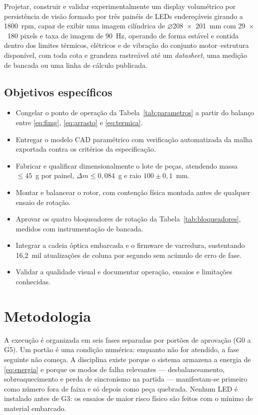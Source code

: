 \documentclass[10pt,a4paper,twocolumn]{article}
\begin{document}
Projetar, construir e validar experimentalmente um display volumétrico por
persistência de visão formado por três painéis de LEDs endereçáveis girando a
1800~rpm, capaz de exibir uma imagem cilíndrica de
$\varnothing$208~$\times$~201~mm com 29~$\times$~180 pixels e taxa de imagem de
90~Hz, operando de forma estável e contida dentro dos limites térmicos,
elétricos e de vibração do conjunto motor--estrutura disponível, com toda cota
e grandeza rastreável até um \emph{datasheet}, uma medição de bancada ou uma
linha de cálculo publicada.

\subsection{Objetivos específicos}

\begin{itemize}
  \item Congelar o ponto de operação da Tabela~\ref{tab:parametros} a partir do
    balanço entre \eqref{eq:fimg}, \eqref{eq:arrasto} e \eqref{eq:termica}.
  \item Entregar o modelo CAD paramétrico com verificação automatizada da
    malha exportada contra os critérios da especificação.
  \item Fabricar e qualificar dimensionalmente o lote de peças, atendendo massa
    $\leq 45$~g por painel, $\Delta m \leq 0{,}084$~g e raio
    $100 \pm 0{,}1$~mm.
  \item Montar e balancear o rotor, com contenção física montada antes de
    qualquer ensaio de rotação.
  \item Aprovar os quatro bloqueadores de rotação da
    Tabela~\ref{tab:bloqueadores}, medidos com instrumentação de bancada.
  \item Integrar a cadeia óptica embarcada e o firmware de varredura,
    sustentando 16,2~mil atualizações de coluna por segundo sem acúmulo de erro
    de fase.
  \item Validar a qualidade visual e documentar operação, ensaios e limitações
    conhecidas.
\end{itemize}

\section{Metodologia}
\label{sec:metodologia}

A execução é organizada em seis fases separadas por portões de aprovação
(G0 a G5). Um portão é uma condição numérica: enquanto não for atendido, a fase
seguinte não começa. A disciplina existe porque o sistema armazena a energia de
\eqref{eq:energia} e porque os modos de falha relevantes ---
desbalanceamento, sobreaquecimento e perda de sincronismo na partida ---
manifestam-se primeiro como número fora de faixa e só depois como peça
quebrada. Nenhum LED é instalado antes de G3: os ensaios de maior risco físico
são feitos com o mínimo de material embarcado.
\end{document}
